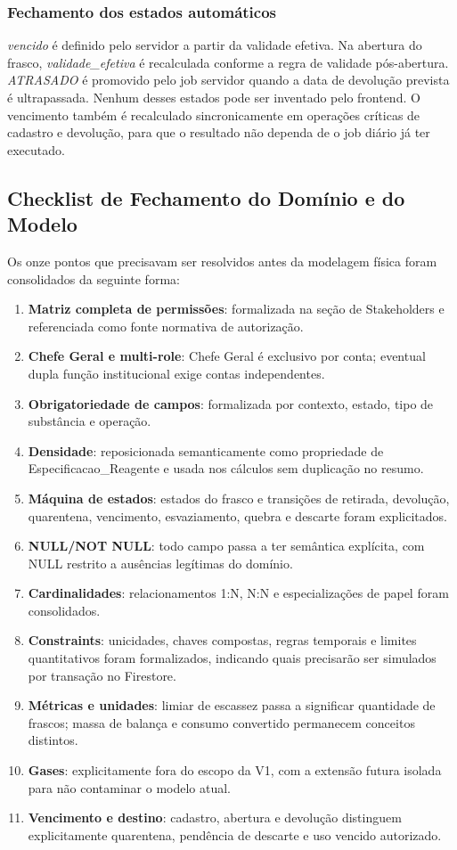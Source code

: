 \documentclass[12pt,a4paper]{article}
\begin{document}
\subsubsection{Fechamento dos estados automáticos}
\textit{vencido} é definido pelo servidor a partir da validade efetiva. Na abertura do frasco, \textit{validade\_efetiva} é recalculada conforme a regra de validade pós-abertura. \textit{ATRASADO} é promovido pelo job servidor quando a data de devolução prevista é ultrapassada. Nenhum desses estados pode ser inventado pelo frontend. O vencimento também é recalculado sincronicamente em operações críticas de cadastro e devolução, para que o resultado não dependa de o job diário já ter executado.

\subsection{Checklist de Fechamento do Domínio e do Modelo}
Os onze pontos que precisavam ser resolvidos antes da modelagem física foram consolidados da seguinte forma:
\begin{enumerate}[label=\textbf{\arabic*.}, leftmargin=*]
    \item \textbf{Matriz completa de permissões}: formalizada na seção de Stakeholders e referenciada como fonte normativa de autorização.
    \item \textbf{Chefe Geral e multi-role}: Chefe Geral é exclusivo por conta; eventual dupla função institucional exige contas independentes.
    \item \textbf{Obrigatoriedade de campos}: formalizada por contexto, estado, tipo de substância e operação.
    \item \textbf{Densidade}: reposicionada semanticamente como propriedade de Especificacao\_Reagente e usada nos cálculos sem duplicação no resumo.
    \item \textbf{Máquina de estados}: estados do frasco e transições de retirada, devolução, quarentena, vencimento, esvaziamento, quebra e descarte foram explicitados.
    \item \textbf{NULL/NOT NULL}: todo campo passa a ter semântica explícita, com NULL restrito a ausências legítimas do domínio.
    \item \textbf{Cardinalidades}: relacionamentos 1:N, N:N e especializações de papel foram consolidados.
    \item \textbf{Constraints}: unicidades, chaves compostas, regras temporais e limites quantitativos foram formalizados, indicando quais precisarão ser simulados por transação no Firestore.
    \item \textbf{Métricas e unidades}: limiar de escassez passa a significar quantidade de frascos; massa de balança e consumo convertido permanecem conceitos distintos.
    \item \textbf{Gases}: explicitamente fora do escopo da V1, com a extensão futura isolada para não contaminar o modelo atual.
    \item \textbf{Vencimento e destino}: cadastro, abertura e devolução distinguem explicitamente quarentena, pendência de descarte e uso vencido autorizado.
\end{enumerate}
\end{document}
